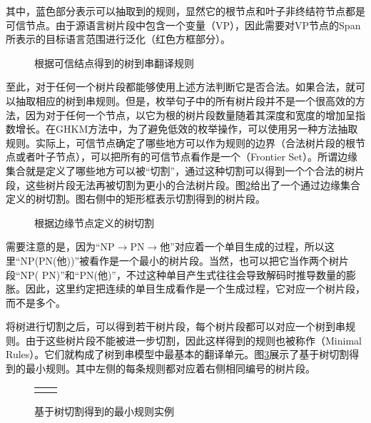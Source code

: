 \noindent 其中，蓝色部分表示可以抽取到的规则，显然它的根节点和叶子非终结符节点都是可信节点。由于源语言树片段中包含一个变量（VP），因此需要对VP节点的Span所表示的目标语言范围进行泛化（红色方框部分）。

\begin{figure}[htp]
\centering

\caption{根据可信结点得到的树到串翻译规则}
\label{fig:4-52}
\end{figure}

\parinterval 至此，对于任何一个树片段都能够使用上述方法判断它是否合法。如果合法，就可以抽取相应的树到串规则。但是，枚举句子中的所有树片段并不是一个很高效的方法，因为对于任何一个节点，以它为根的树片段数量随着其深度和宽度的增加呈指数增长。在GHKM方法中，为了避免低效的枚举操作，可以使用另一种方法抽取规则。实际上，可信节点确定了哪些地方可以作为规则的边界（合法树片段的根节点或者叶子节点），可以把所有的可信节点看作是一个{\small{}}（Frontier Set）。所谓边缘集合就是定义了哪些地方可以被``切割''，通过这种切割可以得到一个个合法的树片段，这些树片段无法再被切割为更小的合法树片段。图\ref{fig:4-53}给出了一个通过边缘集合定义的树切割。图右侧中的矩形框表示切割得到的树片段。

\begin{figure}[htp]
\centering

\caption{根据边缘节点定义的树切割}
\label{fig:4-53}
\end{figure}

\parinterval 需要注意的是，因为``NP$\rightarrow$PN$\rightarrow$他''对应着一个单目生成的过程，所以这里``NP(PN(他))''被看作是一个最小的树片段。当然，也可以把它当作两个树片段``NP( PN)''和``PN(他)''，不过这种单目产生式往往会导致解码时推导数量的膨胀。因此，这里约定把连续的单目生成看作是一个生成过程，它对应一个树片段，而不是多个。

\parinterval 将树进行切割之后，可以得到若干树片段，每个树片段都可以对应一个树到串规则。由于这些树片段不能被进一步切割，因此这样得到的规则也被称作{\small{}}（Minimal Rules）。它们就构成了树到串模型中最基本的翻译单元。图\ref{fig:4-54}展示了基于树切割得到的最小规则。其中左侧的每条规则都对应着右侧相同编号的树片段。

\begin{figure}[htp]
\centering
\begin{tabular}{l l}
\subfigure{} &  \subfigure{}
\end{tabular}
\caption{基于树切割得到的最小规则实例}
\label{fig:4-54}
\end{figure}

